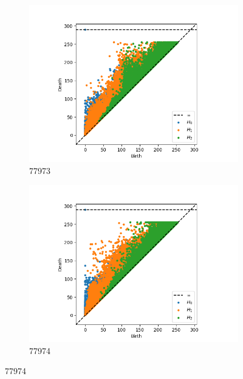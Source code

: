 \documentclass[10pt]{beamer}
\begin{document}
\begin{frame}[fragile]{}
\begin{figure}[ht]
\begin{subfigure}{.5 \linewidth}
    \includegraphics[scale=0.3]{persistence_diagrams/77973_multi_ph.png}
    \caption{77973}
  \end{subfigure}%
  \begin{subfigure}{.5 \linewidth}
    \includegraphics[scale=0.3]{persistence_diagrams/77974_multi_ph.png}
    \caption{77974}
  \end{subfigure}
\end{figure}
\end{frame}
\end{document}
